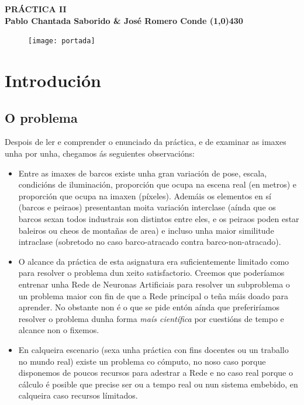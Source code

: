 \documentclass{article}
\begin{document}
	\begin{center}
		\LARGE\bfseries PRÁCTICA II\\
		\small Pablo Chantada Saborido \& José Romero Conde
		\line(1,0){430}
	\end{center}
	
\vspace*{380pt}
	
\begin{figure}[h]
	\centering
	\texttt{[image: portada]}
	\label{fig:portada}
\end{figure}
	
\thispagestyle{empty}
	
\newpage

\tableofcontents

\newpage
	
	
\section{Introdución}
\subsection{O problema}

Despois de ler e comprender o enunciado da práctica, e de examinar as imaxes unha por unha, chegamos ás seguientes observacións:
\begin{itemize}
	\item Entre as imaxes de barcos existe unha gran variación de pose, escala, condicións de iluminación, proporción que ocupa na escena real (en metros) e proporción que ocupa na imaxen (píxeles). Ademáis os elementos en sí (barcos e peiraos) presentantan moita variación interclase (aínda que os barcos sexan todos industrais son distintos entre eles, e os peiraos poden estar baleiros ou cheos de montañas de area) e incluso unha maior similitude intraclase (sobretodo no caso barco-atracado contra barco-non-atracado).
	\item O alcance da práctica de esta asignatura era suficientemente limitado como para resolver o problema dun xeito satisfactorio. Creemos que poderíamos entrenar unha Rede de Neuronas Artificiais para resolver un subproblema o un problema maior con fin de que a Rede principal o teña máis doado para aprender. No obstante non é o que se pide entón aínda que preferiríamos resolver o problema dunha forma \emph{maís científica} por cuestións de tempo e alcance non o fixemos.
	\item En calqueira escenario (sexa unha práctica con fins docentes ou un traballo no mundo real) existe un problema co cómputo, no noso caso porque disponemos de poucos recursos para adestrar a Rede e no caso real porque o cálculo é posible que precise ser ou a tempo real ou nun sistema embebido, en calqueira caso recursos límitados. 
\end{itemize}
\end{document}
